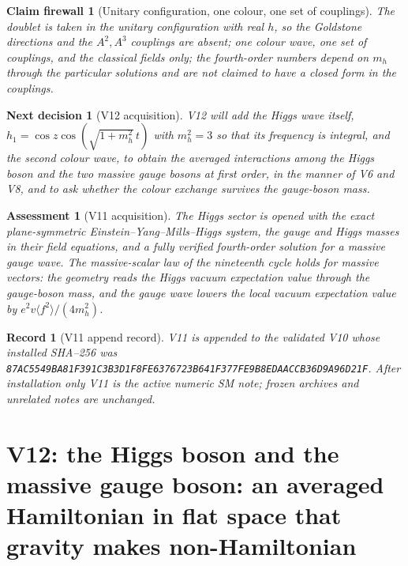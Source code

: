 \documentclass[11pt]{article}
\newtheorem{firewall}[theorem]{Claim firewall}
\newtheorem{decision}[theorem]{Next decision}
\newtheorem{assessment}[theorem]{Assessment}
\newtheorem{record}[theorem]{Record}
\theoremstyle{remark}
\begin{document}
\begin{firewall}[Unitary configuration, one colour, one set of couplings]
\label{fire:v20v11}
The doublet is taken in the unitary configuration with real \(h\), so
the Goldstone directions and the \(A^2,A^3\) couplings are absent;
one colour wave, one set of couplings, and the classical fields only;
the fourth-order numbers depend on \(m_h\) through the particular
solutions and are not claimed to have a closed form in the couplings.
\end{firewall}

\begin{decision}[V12 acquisition]
\label{dec:v20v11-next}
V12 will add the Higgs wave itself, \(h_1=\cos z\cos(\sqrt{1+m_h^2}\,t)\)
with \(m_h^2=3\) so that its frequency is integral, and the second
colour wave, to obtain the averaged interactions among the Higgs
boson and the two massive gauge bosons at first order, in the manner
of V6 and V8, and to ask whether the colour exchange survives the
gauge-boson mass.
\end{decision}

\begin{assessment}[V11 acquisition]
\label{ass:v20v11}
The Higgs sector is opened with the exact plane-symmetric
Einstein--Yang--Mills--Higgs system, the gauge and Higgs masses in
their field equations, and a fully verified fourth-order solution for
a massive gauge wave.  The massive-scalar law of the nineteenth cycle
holds for massive vectors: the geometry reads the Higgs vacuum
expectation value through the gauge-boson mass, and the gauge wave
lowers the local vacuum expectation value by
\(e^2v\langle f^2\rangle/(4m_h^2)\).
\end{assessment}

\begin{record}[V11 append record]
\label{rec:v20v11}
V11 is appended to the validated V10 whose installed SHA--256 was
\texttt{87AC5549BA81F391C3B3D1F8FE6376723B641F377FE9B8EDAACCB36D9A96D21F}.
After installation only V11 is the active numeric SM note; frozen
archives and unrelated notes are unchanged.
\end{record}


\section{V12: the Higgs boson and the massive gauge boson: an averaged Hamiltonian in flat space that gravity makes non-Hamiltonian}
\label{sec:v20v12}
\end{document}
